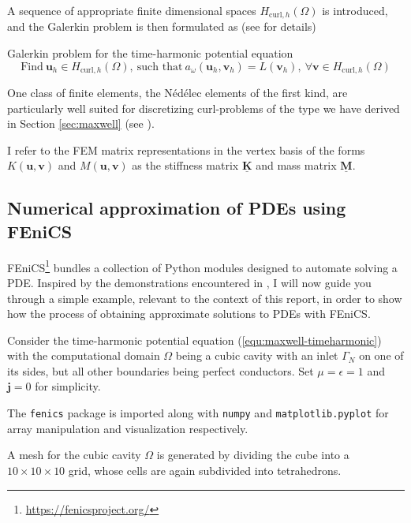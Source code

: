 \documentclass[11pt, a4paper]{article}
\begin{document}
A sequence of appropriate 
finite dimensional spaces $H_{\textrm{curl}, h}(\Omega)$ is introduced, and the
Galerkin problem is then formulated as (see \cite{numapproxPDEs} for details)
\begin{fancybox}{Galerkin problem for the time-harmonic potential equation}
    \begin{equation}
        \text{Find}~\mathbf{u}_h \in H_{\textrm{curl},h}(\Omega),~\text{such that}~a_{\omega}(\mathbf{u}_h, \mathbf{v}_h) = L(\mathbf{v}_h), ~\forall \mathbf{v} \in H_{\textrm{curl}, h}(\Omega) \label{equ:galerkin-problem}
    \end{equation}
\end{fancybox}
One class of finite elements, the Nédélec elements of the first
kind, are particularly well suited for discretizing curl-problems of the type
we have derived in Section \ref{sec:maxwell} (see \cite{monk}).

I refer to the \acrshort{FEM} matrix representations in the vertex basis of the forms
$K(\mathbf{u}, \mathbf{v})$ and $M(\mathbf{u}, \mathbf{v})$ as the
stiffness matrix $\mathbf{\underline{K}}$ and mass matrix $\mathbf{\underline{M}}$.

\subsection{Numerical approximation of \acrshort{PDE}s using FEniCS}
\label{subsec:fem-demo}

FEniCS\footnote{\url{https://fenicsproject.org/}} bundles a collection of Python
modules designed to automate solving a \acrfull{PDE}.
Inspired by the demonstrations encountered in \cite{fenics}, I will now guide you
through a simple example, relevant to the context of this report, in order to
show how the process of obtaining
approximate solutions to \acrshort{PDE}s with FEniCS.

Consider the time-harmonic potential equation (\ref{equ:maxwell-timeharmonic})
with the computational domain $\Omega$ being a cubic cavity with an inlet $\Gamma_N$
on one of its sides, but all other boundaries being perfect conductors.
Set $\mu = \epsilon = 1$ and $\mathbf{j} = 0$ for simplicity.

The \texttt{fenics} package is imported along with \texttt{numpy} and
\texttt{matplotlib.pyplot} for array manipulation and visualization respectively.


A mesh for the cubic cavity $\Omega$ is generated by dividing the cube into a
$10\times10\times10$ grid, whose cells are again subdivided into tetrahedrons.

\end{document}
